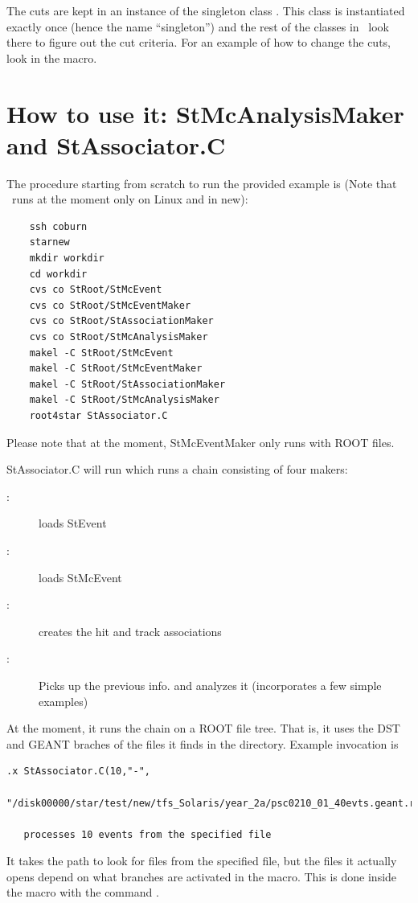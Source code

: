 The cuts are kept in an instance of the singleton class .  This
class is instantiated exactly once (hence the name ``singleton'') and the rest of
the classes in \StAssociationMaker\ look there to figure out the cut criteria.
For an example of how to change the cuts, look in the 
macro.  




\section{How to use it: StMcAnalysisMaker and StAssociator.C}
\label{sec:howto}
The procedure starting from scratch to run the provided 
example is (Note that \StAssociationMaker\ runs at the moment
only on Linux and in new):
\begin{verbatim}
    ssh coburn 
    starnew
    mkdir workdir
    cd workdir
    cvs co StRoot/StMcEvent
    cvs co StRoot/StMcEventMaker
    cvs co StRoot/StAssociationMaker
    cvs co StRoot/StMcAnalysisMaker
    makel -C StRoot/StMcEvent
    makel -C StRoot/StMcEventMaker
    makel -C StRoot/StAssociationMaker
    makel -C StRoot/StMcAnalysisMaker
    root4star StAssociator.C
\end{verbatim}

Please note that at the moment, StMcEventMaker only runs with ROOT files.

StAssociator.C will run  which runs a %
chain consisting of four makers:
\begin{description}
\item[:] loads StEvent
\item[:] loads StMcEvent
\item[:] creates the hit and track associations
\item[:] Picks up the previous info. and analyzes it 
    (incorporates a few simple examples)
\end{description}


At the moment, it runs the chain on a ROOT file tree.  That is, it uses the DST
and GEANT braches of the files it finds in the directory.  Example invocation
is 
\begin{verbatim}
.x StAssociator.C(10,"-",
    "/disk00000/star/test/new/tfs_Solaris/year_2a/psc0210_01_40evts.geant.root")

   processes 10 events from the specified file

\end{verbatim}
It takes the path to look for files from the specified file, but the files it
actually opens depend on
what branches are activated in the macro.
This is done inside the macro with the command .


